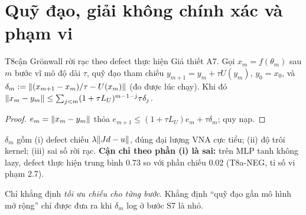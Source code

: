 \section{Quỹ đạo, giải không chính xác và phạm vi}\label{sec:robust}

\begin{namedthm}{T8}{cận Grönwall rời rạc theo defect thực hiện}
Giả thiết A7. Gọi $x_m=f(\theta_m)$ sau $m$ bước vĩ mô độ dài $\tau$, quỹ đạo tham chiếu $y_{m+1}=y_m+\tau U(y_m)$, $y_0=x_0$, và $\delta_m:=\lVert (x_{m+1}-x_m)/\tau-U(x_m)\rVert$ (đo được lúc chạy). Khi đó $\lVert x_m-y_m\rVert\le\sum_{j<m}(1+\tau L_U)^{m-1-j}\tau\delta_j$.
\end{namedthm}
\begin{proof}
$e_m=\lVert x_m-y_m\rVert$ thỏa $e_{m+1}\le(1+\tau L_U)e_m+\tau\delta_m$; quy nạp.
\end{proof}
\begin{remark}
$\delta_m$ gồm (i) defect chiếu $\lambda\lVert Jd-u\rVert$, đúng đại lượng VNA cực tiểu; (ii) độ trôi kernel; (iii) sai số rời rạc. \textbf{Cận chỉ theo phần (i) là sai:} trên MLP tanh không lazy, defect thực hiện trung bình 0.73 so với phần chiếu 0.02 (T8a-NEG, tỉ số vi phạm 2.7).
\end{remark}
\begin{hequa}
Chỉ khẳng định \emph{tối ưu chiếu cho từng bước}. Khẳng định ``quỹ đạo gần mô hình mở rộng'' chỉ được đưa ra khi $\delta_m$ log ở bước S7 là nhỏ.
\end{hequa}

